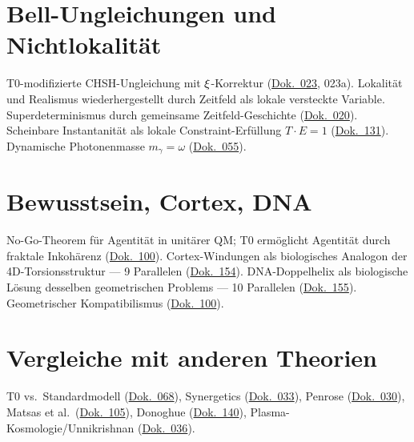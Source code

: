 \section{Bell-Ungleichungen und Nichtlokalität}
T0-modifizierte CHSH-Ungleichung mit $\xi$-Korrektur (\href{https://github.com/jpascher/T0-Time-Mass-Duality/blob/main/2/pdf/023_Bell_De.pdf}{Dok.~023}, 023a). Lokalität und Realismus wiederhergestellt durch Zeitfeld als lokale versteckte Variable. Superdeterminismus durch gemeinsame Zeitfeld-Geschichte (\href{https://github.com/jpascher/T0-Time-Mass-Duality/blob/main/2/pdf/020_T0_QM-QFT-RT_De.pdf}{Dok.~020}). Scheinbare Instantanität als lokale Constraint-Erfüllung $T \cdot E = 1$ (\href{https://github.com/jpascher/T0-Time-Mass-Duality/blob/main/2/pdf/131_scheinbar_instantan_De.pdf}{Dok.~131}). Dynamische Photonenmasse $m_\gamma = \omega$ (\href{https://github.com/jpascher/T0-Time-Mass-Duality/blob/main/2/pdf/055_DynMassePhotonenNichtlokal_De.pdf}{Dok.~055}).

\section{Bewusstsein, Cortex, DNA}
No-Go-Theorem für Agentität in unitärer QM; T0 ermöglicht Agentität durch fraktale Inkohärenz (\href{https://github.com/jpascher/T0-Time-Mass-Duality/blob/main/2/pdf/100_Consciousness_De.pdf}{Dok.~100}). Cortex-Windungen als biologisches Analogon der 4D-Torsionsstruktur --- 9 Parallelen (\href{https://github.com/jpascher/T0-Time-Mass-Duality/blob/main/2/pdf/154_Cortex_De.pdf}{Dok.~154}). DNA-Doppelhelix als biologische Lösung desselben geometrischen Problems --- 10 Parallelen (\href{https://github.com/jpascher/T0-Time-Mass-Duality/blob/main/2/pdf/155_DNA_De.pdf}{Dok.~155}). Geometrischer Kompatibilismus (\href{https://github.com/jpascher/T0-Time-Mass-Duality/blob/main/2/pdf/100_Consciousness_De.pdf}{Dok.~100}).

\section{Vergleiche mit anderen Theorien}
T0 vs.\ Standardmodell (\href{https://github.com/jpascher/T0-Time-Mass-Duality/blob/main/2/pdf/068_T0vsESM_ConceptualAnalysis_De.pdf}{Dok.~068}), Synergetics (\href{https://github.com/jpascher/T0-Time-Mass-Duality/blob/main/2/pdf/033_T0-Theory-vs-Synergetics_De.pdf}{Dok.~033}), Penrose (\href{https://github.com/jpascher/T0-Time-Mass-Duality/blob/main/2/pdf/030_T0_penrose_De.pdf}{Dok.~030}), Matsas et al.\ (\href{https://github.com/jpascher/T0-Time-Mass-Duality/blob/main/2/pdf/105_Matsas_T0_Vergleich_De.pdf}{Dok.~105}), Donoghue (\href{https://github.com/jpascher/T0-Time-Mass-Duality/blob/main/2/pdf/140_T0_CMB_Donoghue_Analyse_De.pdf}{Dok.~140}), Plasma-Kosmologie/Unnikrishnan (\href{https://github.com/jpascher/T0-Time-Mass-Duality/blob/main/2/pdf/036_T0_peratt_De.pdf}{Dok.~036}).

